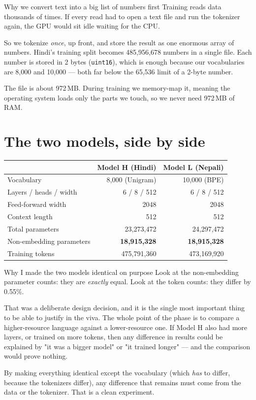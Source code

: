 \documentclass[11pt]{report}
\newcommand{\p}[1]{\texttt{#1}}
\begin{document}
\begin{concept}{Why we convert text into a big list of numbers first}
Training reads data thousands of times. If every read had to open a text file
and run the tokenizer again, the GPU would sit idle waiting for the CPU.

So we tokenize \emph{once}, up front, and store the result as one enormous array
of numbers. Hindi's training split becomes 485,956,678 numbers in a single file.
Each number is stored in 2 bytes (\p{uint16}), which is enough because our
vocabularies are 8,000 and 10,000 --- both far below the 65,536 limit of a
2-byte number.

The file is about 972\,MB. During training we memory-map it, meaning the
operating system loads only the parts we touch, so we never need 972\,MB of RAM.
\end{concept}

\section{The two models, side by side}

\begin{center}
\begin{tabular}{lrr}
\toprule
& \textbf{Model H (Hindi)} & \textbf{Model L (Nepali)} \\
\midrule
Vocabulary & 8,000 (Unigram) & 10,000 (BPE) \\
Layers / heads / width & 6 / 8 / 512 & 6 / 8 / 512 \\
Feed-forward width & 2048 & 2048 \\
Context length & 512 & 512 \\
Total parameters & 23,273,472 & 24,297,472 \\
Non-embedding parameters & \textbf{18,915,328} & \textbf{18,915,328} \\
Training tokens & 475,791,360 & 473,169,920 \\
\bottomrule
\end{tabular}
\end{center}

\begin{implementation}{Why I made the two models identical on purpose}
Look at the non-embedding parameter counts: they are \emph{exactly} equal.
Look at the token counts: they differ by 0.55\%.

That was a deliberate design decision, and it is the single most important thing
to be able to justify in the viva. The whole point of the phase is to compare a
higher-resource language against a lower-resource one. If Model H also had more
layers, or trained on more tokens, then any difference in results could be
explained by "it was a bigger model" or "it trained longer" --- and the
comparison would prove nothing.

By making everything identical except the vocabulary (which \emph{has} to differ,
because the tokenizers differ), any difference that remains must come from the
data or the tokenizer. That is a clean experiment.
\end{implementation}
\end{document}
